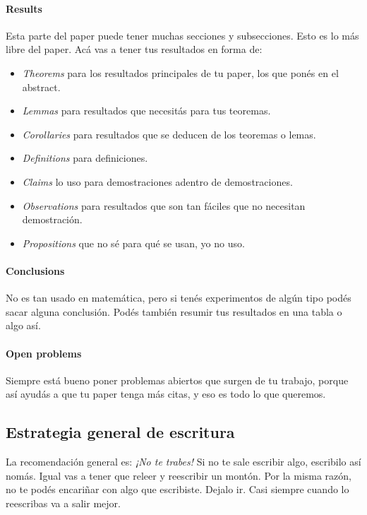 \documentclass{article}
\begin{document}
\paragraph{Results} Esta parte del paper puede tener muchas secciones y subsecciones. Esto es lo más libre del paper. Acá vas a tener tus resultados en forma de:
\begin{itemize}
    \item\emph{Theorems} para los resultados principales de tu paper, los que ponés en el abstract.
    \item\emph{Lemmas} para resultados que necesitás para tus teoremas.
    \item\emph{Corollaries} para resultados que se deducen de los teoremas o lemas.
    \item\emph{Definitions} para definiciones.
    \item\emph{Claims} lo uso para demostraciones adentro de demostraciones.
    \item\emph{Observations} para resultados que son tan fáciles que no necesitan demostración.
    \item\emph{Propositions} que no sé para qué se usan, yo no uso.
\end{itemize}

\paragraph{Conclusions} No es tan usado en matemática, pero si tenés experimentos de algún tipo podés sacar alguna conclusión. Podés también resumir tus resultados en una tabla o algo así.

\paragraph{Open problems} Siempre está bueno poner problemas abiertos que surgen de tu trabajo, porque así ayudás a que tu paper tenga más citas, y eso es todo lo que queremos.

\subsection{Estrategia general de escritura}
La recomendación general es: \emph{¡No te trabes!} Si no te sale escribir algo, escribilo así nomás. Igual vas a tener que releer y reescribir un montón. Por la misma razón, no te podés encariñar con algo que escribiste. Dejalo ir. Casi siempre cuando lo reescribas va a salir mejor.
\end{document}
